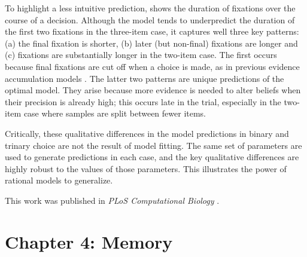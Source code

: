 \documentclass[dsingle]{memo}
\begin{document}

To highlight a less intuitive prediction,  shows the duration of fixations over the course of a decision. Although the model tends to underpredict the duration of the first two fixations in the three-item case, it captures well three key patterns: (a) the final fixation is shorter, (b) later (but non-final) fixations are longer and (c) fixations are substantially longer in the two-item case. The first occurs because final fixations are cut off when a choice is made, as in previous evidence accumulation models \citep{krajbich2010visual}. The latter two patterns are unique predictions of the optimal model. They arise because more evidence is needed to alter beliefs when their precision is already high; this occurs late in the trial, especially in the two-item case where samples are split between fewer items.

Critically, these qualitative differences in the model predictions in binary and trinary choice are not the result of model fitting. The same set of parameters are used to generate predictions in each case, and the key qualitative differences are highly robust to the values of those parameters. This illustrates the power of rational models to generalize.

This work was published in \emph{PLoS Computational Biology} \citep{callaway2021fixation}.

\section{Chapter 4: Memory}
\end{document}
